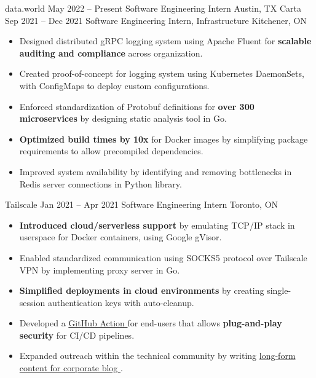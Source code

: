 \documentclass{article}
\begin{document}
\WorkEntry
  {data.world}
  {May 2022 -- Present}
  {Software Engineering Intern \hfill Austin, TX}
  {\vspace{2.5mm}}
\WorkEntry
  {Carta}
  {Sep 2021 -- Dec 2021}
  {Software Engineering Intern, Infrastructure \hfill Kitchener, ON}
  {
    \begin{itemize} \itemsep -1pt
      \item Designed distributed gRPC logging system using Apache Fluent for \textbf{scalable auditing and compliance} across organization.
      \item Created proof-of-concept for logging system using Kubernetes DaemonSets, with ConfigMaps to deploy custom configurations.
      \item Enforced standardization of Protobuf definitions for \textbf{over 300 microservices} by designing static analysis tool in Go.
      \item \textbf{Optimized build times by 10x} for Docker images by simplifying package requirements to allow precompiled dependencies.
      \item Improved system availability by identifying and removing bottlenecks in Redis server connections in Python library.
    \end{itemize}
  }
\WorkEntry
  {Tailscale}
  {Jan 2021 -- Apr 2021}
  {Software Engineering Intern \hfill Toronto, ON}
  {
    \begin{itemize} \itemsep -1pt
      \item \textbf{Introduced cloud/serverless support} by emulating TCP/IP stack in userspace for Docker containers, using Google gVisor.
      \item Enabled standardized communication using SOCKS5 protocol over Tailscale VPN by implementing proxy server in Go.
      \item \textbf{Simplified deployments in cloud environments} by creating single-session authentication keys with auto-cleanup.
      \item Developed a \href{https://github.com/tailscale/github-action}{GitHub Action \linkIcon} for end-users that allows \textbf{plug-and-play security} for CI/CD pipelines.
      \item Expanded outreach within the technical community by writing \href{https://tailscale.com/blog/2021-05-github-actions-and-tailscale/}{long-form content for corporate blog \linkIcon}.
    \end{itemize}
  }
\end{document}
